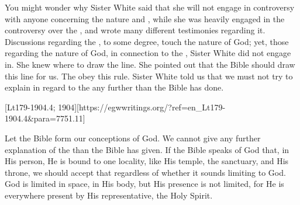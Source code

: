 You might wonder why Sister White said that she will not engage in controversy with anyone concerning the nature and , while she was heavily engaged in the controversy over the , and wrote many different testimonies regarding it. Discussions regarding the , to some degree, touch the nature of God; yet, those regarding the nature of God, in connection to the , Sister White did not engage in. She knew where to draw the line. She pointed out that the Bible should draw this line for us.  The  obey this rule. Sister White told us that we must not try to explain in regard to the  any further than the Bible has done.

[Lt179-1904.4; 1904][https://egwwritings.org/?ref=en\_Lt179-1904.4&para=7751.11]

Let the Bible form our conceptions of God. We cannot give any further explanation of the  than the Bible has given. If the Bible speaks of God that, in His person, He is bound to one locality, like His temple, the sanctuary, and His throne, we should accept that regardless of whether it sounds limiting to God. God is limited in space, in His body, but His presence is not limited, for He is everywhere present by His representative, the Holy Spirit.

